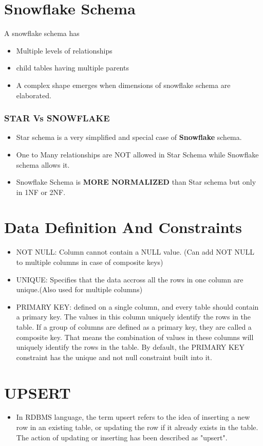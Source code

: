\documentclass[
	paper=a4,%
	pagesize,%
	8pt, fleqn,%
	headings=small,%
	notitlepage,%
	parskip=never]%
	{scrreprt}
\begin{document}
\begin{multicols*}{3}
\section{Snowflake Schema}
A snowflake schema has 
\begin{itemize}
\item Multiple levels of relationships
\item child tables having multiple parents
\item A complex shape emerges when dimensions of snowflake schema are elaborated.
\end{itemize}

\subsubsection*{STAR Vs SNOWFLAKE}
\begin{itemize}
\item Star schema is a very simplified and special case of \textbf{Snowflake} schema.
\item One to Many relationships are NOT allowed in Star Schema while Snowflake schema allows it.
\item Snowflake Schema is \textbf{MORE NORMALIZED} than Star schema but only in 1NF or 2NF.
\end{itemize}

\section{Data Definition And Constraints}
\begin{itemize}
\item NOT NULL: Column cannot contain a NULL value. (Can add NOT NULL to multiple columns in case of composite keys)
\item UNIQUE: Specifies that the data accross all the rows in one column are unique.(Also used for multiple columns)

\item PRIMARY KEY: defined on a single column, and every table should contain a primary key. The values in this column uniquely identify the rows in the table. If a group of columns are defined as a primary key, they are called a composite key. That means the combination of values in these columns will uniquely identify the rows in the table. By default, the PRIMARY KEY constraint has the unique and not null constraint built into it.
\end{itemize}


\section{UPSERT}
\begin{itemize}
\item In RDBMS language, the term upsert refers to the idea of inserting a new row in an existing table, or updating the row if it already exists in the table. The action of updating or inserting has been described as "upsert".


\end{itemize}
\end{multicols*}
\end{document}
